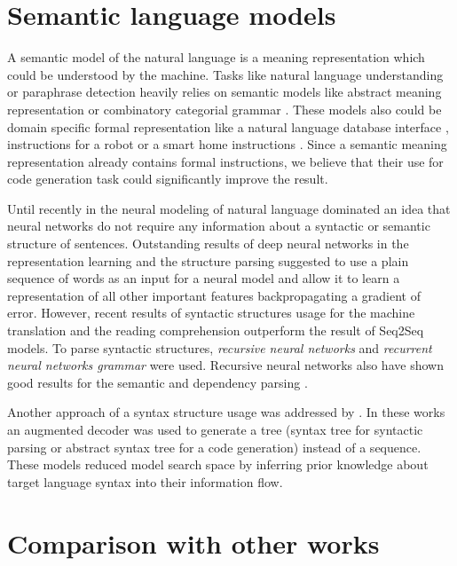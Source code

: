 \section{Semantic language models}
A semantic model of the natural language is a meaning representation which could be understood by the machine. Tasks like natural language understanding or paraphrase detection heavily relies on semantic models like abstract meaning representation \parencite{banarescu2013abstract} or combinatory categorial grammar \parencite{Clark2007}. These models also could be domain specific formal representation like a natural language database interface \parencite{Zettlemoyer2012, berant2013semantic}, instructions for a robot \parencite{artzi2013weakly} or a smart home instructions \parencite{quirk2015language}. Since a semantic meaning representation already contains formal instructions, we believe that their use for code generation task could significantly improve the result.

Until recently in the neural modeling of natural language dominated an idea that neural networks do not require any information about a syntactic or semantic structure of sentences. Outstanding results of deep neural networks in the representation learning and the structure parsing suggested to use a plain sequence of words as an input for a neural model and allow it to learn a representation of all other important features backpropagating a gradient of error. However, recent results of syntactic structures usage for the machine translation \parencite{Chen2017} and the reading comprehension \parencite{xie2017constituent} outperform the result of Seq2Seq models. To parse syntactic structures, \emph{recursive neural networks} \parencite{Goller, socher2011parsing} and \emph{recurrent neural networks grammar} \parencite{Dyer2016} were used. Recursive neural networks also have shown good results for the semantic \parencite{Tai2015} and dependency parsing \parencite{Zhu2015}. 

Another approach of a syntax structure usage was addressed by \cite{Dong2016, Yin2017, Rabinovich2017}. In these works an augmented decoder was used to generate a tree (syntax tree for syntactic parsing or abstract syntax tree for a code generation) instead of a sequence. These models reduced model search space by inferring prior knowledge about target language syntax into their information flow.

\section{Comparison with other works}

